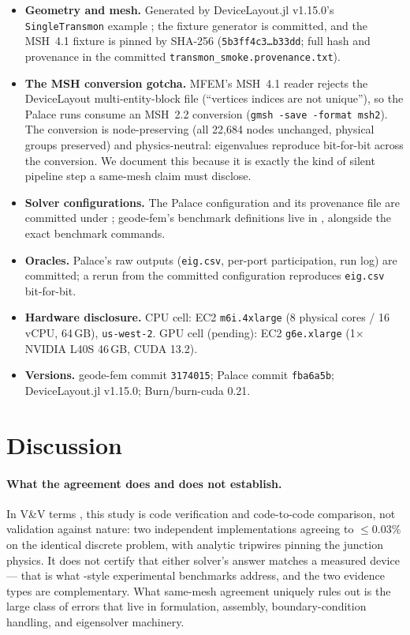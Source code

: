 \documentclass{anvil-paper}
\begin{document}
\begin{itemize}
  \item \textbf{Geometry and mesh.} Generated by DeviceLayout.jl v1.15.0's
    \texttt{SingleTransmon} example \citep{devicelayout}; the fixture
    generator is committed, and the MSH~4.1 fixture is pinned by SHA-256
    (\texttt{5b3ff4c3\ldots{}b33dd}; full hash and provenance in the
    committed \texttt{transmon\_smoke.provenance.txt}).
  \item \textbf{The MSH conversion gotcha.} MFEM's MSH~4.1 reader rejects
    the DeviceLayout multi-entity-block file (``vertices indices are not
    unique''), so the Palace runs consume an MSH~2.2 conversion
    (\texttt{gmsh -save -format msh2}). The conversion is node-preserving
    (all 22{,}684 nodes unchanged, physical groups preserved) and
    physics-neutral: eigenvalues reproduce bit-for-bit across the
    conversion. We document this because it is exactly the kind of silent
    pipeline step a same-mesh claim must disclose.
  \item \textbf{Solver configurations.} The Palace configuration and its
    provenance file are committed under
    ; geode-fem's benchmark
    definitions live in ,
    alongside the exact benchmark commands.
  \item \textbf{Oracles.} Palace's raw outputs (\texttt{eig.csv},
    per-port participation, run log) are committed; a rerun from the
    committed configuration reproduces \texttt{eig.csv} bit-for-bit.
  \item \textbf{Hardware disclosure.} CPU cell: EC2 \texttt{m6i.4xlarge}
    (8 physical cores / 16 vCPU, 64\,GB), \texttt{us-west-2}. GPU cell
    (pending): EC2 \texttt{g6e.xlarge} (1$\times$ NVIDIA L40S 46\,GB,
    CUDA 13.2).
  \item \textbf{Versions.} geode-fem commit \texttt{3174015}; Palace
    commit \texttt{fba6a5b}; DeviceLayout.jl v1.15.0; Burn/burn-cuda 0.21.
\end{itemize}

\section{Discussion}
\label{sec:discussion}

\paragraph{What the agreement does and does not establish.}
In V\&V terms \citep{roache1997quantification,oberkampf2010verification},
this study is code verification and code-to-code comparison, not
validation against nature: two independent implementations agreeing to
$\leq 0.03\%$ on the identical discrete problem, with analytic tripwires
pinning the junction physics. It does not certify that either solver's
answer matches a measured device --- that is what
\citet{ye2025electromagnetic}-style experimental benchmarks address, and
the two evidence types are complementary. What same-mesh agreement
uniquely rules out is the large class of errors that live in formulation,
assembly, boundary-condition handling, and eigensolver machinery.
\end{document}
